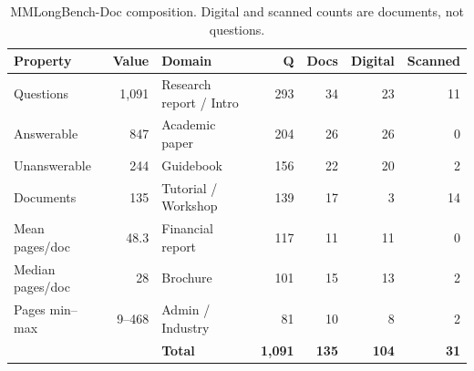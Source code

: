 \begin{table}[h]
\centering
\small
\begin{tabular}{lr@{\hskip 2em}lrrrr}
\toprule
Property & Value & Domain & Q & Docs & Digital & Scanned \\
\midrule
Questions        & 1,091 & Research report / Intro & 293 & 34 & 23 & 11 \\
Answerable       & 847   & Academic paper          & 204 & 26 & 26 & 0 \\
Unanswerable     & 244   & Guidebook               & 156 & 22 & 20 & 2 \\
Documents        & 135   & Tutorial / Workshop     & 139 & 17 & 3  & 14 \\
Mean pages/doc   & 48.3  & Financial report        & 117 & 11 & 11 & 0 \\
Median pages/doc & 28    & Brochure                & 101 & 15 & 13 & 2 \\
Pages min--max   & 9--468 & Admin / Industry       & 81  & 10 & 8  & 2 \\
\midrule
                 &       & \textbf{Total}          & \textbf{1,091} & \textbf{135} & \textbf{104} & \textbf{31} \\
\bottomrule
\end{tabular}
\caption{MMLongBench-Doc composition. Digital and scanned counts are documents, not questions.}
\label{tab:mmlb_composition}
\end{table}